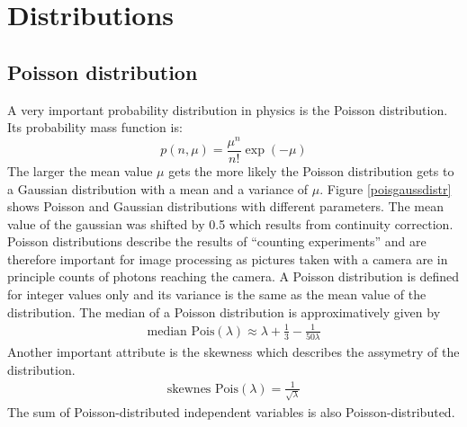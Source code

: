 \section{Distributions}
\subsection{Poisson distribution}
A very important probability distribution in physics is the Poisson
distribution. Its probability mass function is:
\begin{equation}
	p(n,\mu) = \frac{\mu^n}{n!}\exp(-\mu)
\end{equation}
The larger the mean value $\mu$ gets the more likely the Poisson distribution gets to a Gaussian distribution with a mean and a variance of $\mu$. Figure \ref{poisgaussdistr} shows Poisson and Gaussian distributions with different parameters. The mean value of the gaussian was shifted by 0.5 which results from continuity correction.\newline
Poisson distributions describe the results of ``counting experiments'' and are
therefore important for image processing as pictures taken with a
camera are in principle counts of photons reaching the camera.  \newline
A Poisson distribution is defined for integer values only and its variance is
the same as the mean value of the distribution.\newline
The median of a Poisson distribution is approximatively given by
\begin{align}
	\text{median Pois}(\lambda) \approx \lambda + \frac{1}{3} - \frac{1}{50\lambda} \label{meanMedianPoiss}
\end{align}
Another important attribute is
the skewness which describes the assymetry of the distribution.
\begin{align}
 \text{skewnes Pois}(\lambda) = \frac{1}{\sqrt{\lambda}}
\end{align}
The sum of Poisson-distributed independent variables is also Poisson-distributed.
